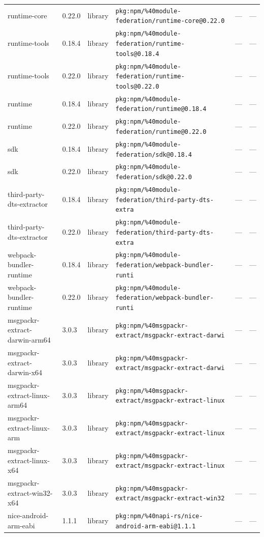 \documentclass[11pt]{article}
\begin{document}
\begin{longtable}{|l|l|l|p{2.2cm}|l|p{4cm}|}
runtime-core & 0.22.0 & library & \texttt{pkg:npm/\%40module-federation/runtime-core@0.22.0} & — & — \\
runtime-tools & 0.18.4 & library & \texttt{pkg:npm/\%40module-federation/runtime-tools@0.18.4} & — & — \\
runtime-tools & 0.22.0 & library & \texttt{pkg:npm/\%40module-federation/runtime-tools@0.22.0} & — & — \\
runtime & 0.18.4 & library & \texttt{pkg:npm/\%40module-federation/runtime@0.18.4} & — & — \\
runtime & 0.22.0 & library & \texttt{pkg:npm/\%40module-federation/runtime@0.22.0} & — & — \\
sdk & 0.18.4 & library & \texttt{pkg:npm/\%40module-federation/sdk@0.18.4} & — & — \\
sdk & 0.22.0 & library & \texttt{pkg:npm/\%40module-federation/sdk@0.22.0} & — & — \\
third-party-dts-extractor & 0.18.4 & library & \texttt{pkg:npm/\%40module-federation/third-party-dts-extra} & — & — \\
third-party-dts-extractor & 0.22.0 & library & \texttt{pkg:npm/\%40module-federation/third-party-dts-extra} & — & — \\
webpack-bundler-runtime & 0.18.4 & library & \texttt{pkg:npm/\%40module-federation/webpack-bundler-runti} & — & — \\
webpack-bundler-runtime & 0.22.0 & library & \texttt{pkg:npm/\%40module-federation/webpack-bundler-runti} & — & — \\
msgpackr-extract-darwin-arm64 & 3.0.3 & library & \texttt{pkg:npm/\%40msgpackr-extract/msgpackr-extract-darwi} & — & — \\
msgpackr-extract-darwin-x64 & 3.0.3 & library & \texttt{pkg:npm/\%40msgpackr-extract/msgpackr-extract-darwi} & — & — \\
msgpackr-extract-linux-arm64 & 3.0.3 & library & \texttt{pkg:npm/\%40msgpackr-extract/msgpackr-extract-linux} & — & — \\
msgpackr-extract-linux-arm & 3.0.3 & library & \texttt{pkg:npm/\%40msgpackr-extract/msgpackr-extract-linux} & — & — \\
msgpackr-extract-linux-x64 & 3.0.3 & library & \texttt{pkg:npm/\%40msgpackr-extract/msgpackr-extract-linux} & — & — \\
msgpackr-extract-win32-x64 & 3.0.3 & library & \texttt{pkg:npm/\%40msgpackr-extract/msgpackr-extract-win32} & — & — \\
nice-android-arm-eabi & 1.1.1 & library & \texttt{pkg:npm/\%40napi-rs/nice-android-arm-eabi@1.1.1} & — & — \\

\end{longtable}
\end{document}
